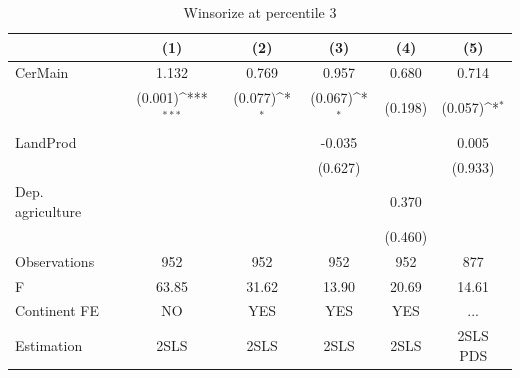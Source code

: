 \documentclass[12pt,a4paper]{article}
\begin{document}
\begin{table}[htbp]\centering
\def\sym#1{\ifmmode^{#1}\else\(^{#1}\)\fi}
\caption{Winsorize at percentile 3}
\begin{tabular}{l*{5}{c}}
\hline\hline
                &\multicolumn{1}{c}{(1)}         &\multicolumn{1}{c}{(2)}         &\multicolumn{1}{c}{(3)}         &\multicolumn{1}{c}{(4)}         &\multicolumn{1}{c}{(5)}         \\
\hline
CerMain         &    1.132         &    0.769         &    0.957         &    0.680         &    0.714         \\
                &  (0.001)\sym{***}&  (0.077)\sym{*}  &  (0.067)\sym{*}  &  (0.198)         &  (0.057)\sym{*}  \\
LandProd        &                  &                  &   -0.035         &                  &    0.005         \\
                &                  &                  &  (0.627)         &                  &  (0.933)         \\
Dep. agriculture&                  &                  &                  &    0.370         &                  \\
                &                  &                  &                  &  (0.460)         &                  \\
\hline
Observations    &      952         &      952         &      952         &      952         &      877         \\
F               &    63.85         &    31.62         &    13.90         &    20.69         &    14.61         \\
Continent FE    &       NO         &      YES         &      YES         &      YES         &      ...         \\
Estimation      &     2SLS         &     2SLS         &     2SLS         &     2SLS         & 2SLS PDS         \\
\hline\hline
\end{tabular}
\end{table}
\end{document}
